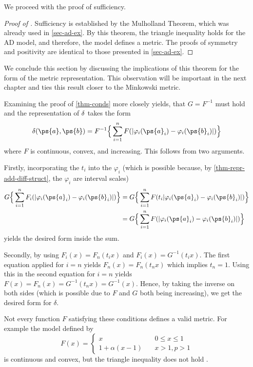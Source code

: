 We proceed with the proof of sufficiency.

\begin{proof}[Proof of ]
  Sufficiency is established by the Mulholland Theorem, which was already used in \cref{sec-ad-ex}.
  By this theorem, the triangle inequality holds for the AD model, and therefore, the model defines a metric. The proofs of symmetry and positivity are identical to those presented in \cref{sec-ad-ex}.
\end{proof}


We conclude this section by discussing the implications of this theorem for the form of the metric representation. This observation will be important in the next chapter and ties this result closer to the Minkowski metric.

\begin{rem} \label{rem-metric-form}
	Examining the proof of \cref{thm-conds} more closely yields, that $G=F^{-1}$ must hold and the representation of $\operatorname{\delta}$ takes the form
	\begin{equation*}
		\delta(\ps{a},\ps{b}) = F^{-1} \Big \{ \sum_{i=1}^{n} F(| \varphi_i(\ps{a}_i) - \varphi_i(\ps{b}_i) |) \Big \}
	\end{equation*}
	where $F$ is continuous, convex, and increasing.	This follows from two arguments.

	Firstly, incorporating the $t_i$ into the $\varphi_i$ (which is possible because, by \cref{thm-repr-add-diff-struct}, the $\varphi_i$ are interval scales)
	\begin{align*}
		G \Big \{ \sum_{i=1}^{n} F_i(| \varphi_i(\ps{a}_i) - \varphi_i(\ps{b}_i) |) \Big \}
		 & = G \Big \{ \sum_{i=1}^{n} F(t_i| \varphi_i(\ps{a}_i) - \varphi_i(\ps{b}_i) |) \Big \} \\
		 & = G \Big \{ \sum_{i=1}^{n} F(| \varphi_i(\ps{a}_i) - \varphi_i(\ps{b}_i) |) \Big \}
	\end{align*}
	yields the desired form inside the sum.

	Secondly, by using $F_i(x) = F_n(t_i x)$ and $F_i(x) = G^{-1}(t_i x)$.
	The first equation applied for $i=n$ yields $F_n(x) = F_n(t_n x)$ which implies $t_n = 1$. Using this in the second equation for $i=n$ yields $F(x) = F_n(x) = G^{-1}(t_n x) = G^{-1}(x)$. Hence, by taking the inverse on both sides (which is possible due to $F$ and $G$ both being increasing), we get the desired form for $\delta$.
\end{rem}

\begin{ex} \label{ex-not-metric}
Not every function $F$ satisfying these conditions defines a valid metric.
For example the model defined by
$$
F(x) = \begin{cases}
x &\quad 0 \leq x \leq 1\\
1 + \alpha(x-1) &\quad x >1, p > 1
\end{cases}
$$
is continuous and convex, but the triangle inequality does not hold \parencite[p. 187]{foundations2}.
\end{ex}
